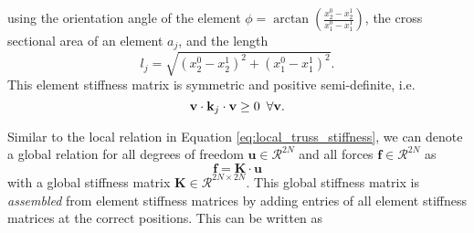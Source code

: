 using the orientation angle of the element $\phi = \arctan\left(\frac{x^0_2-x^1_2}{x^0_1-x^1_1}\right)$, the cross sectional area of an element $a_j$, and the length 
\begin{equation}
    l_j = \sqrt{(x^0_2-x^1_2)^2 + (x^0_1-x^1_1)^2}.
\end{equation}
This element stiffness matrix is symmetric and positive semi-definite, i.e. \begin{equation}
    \mathbf{v} \cdot \mathbf{k}_j \cdot \mathbf{v} \ge 0 \hspace{0.5em} \forall \mathbf{v}.
\end{equation}

Similar to the local relation in Equation \eqref{eq:local_truss_stiffness}, we can denote a global relation for all degrees of freedom $\mathbf{u} \in \mathcal{R}^{2N}$ and all forces $\mathbf{f} \in \mathcal{R}^{2N}$ as 
\begin{equation}
    \mathbf{f} = \mathbf{K} \cdot  \mathbf{u} 
    \label{eq:global_stiffness}
\end{equation}
with a global stiffness matrix $\mathbf{K} \in \mathcal{R}^{2N \times 2N}$. This global stiffness matrix is \emph{assembled} from element stiffness matrices by adding entries of all element stiffness matrices at the correct positions. This can be written as 
